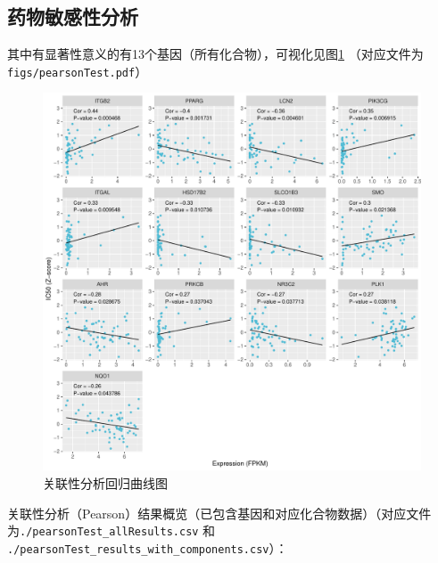 \documentclass[
]{article}
\begin{document}
\hypertarget{ux836fux7269ux654fux611fux6027ux5206ux6790}{%
\subsection{药物敏感性分析}\label{ux836fux7269ux654fux611fux6027ux5206ux6790}}

其中有显著性意义的有13个基因（所有化合物），可视化见图\ref{fig:fig3}
（对应文件为\texttt{figs/pearsonTest.pdf}）

\begin{figure}
\centering
\includegraphics{figs/pearsonTest.pdf}
\caption{\label{fig:fig3}关联性分析回归曲线图}
\end{figure}

关联性分析（Pearson）结果概览（已包含基因和对应化合物数据）（对应文件为\texttt{./pearsonTest\_allResults.csv} 和 \texttt{./pearsonTest\_results\_with\_components.csv}）：
\end{document}

